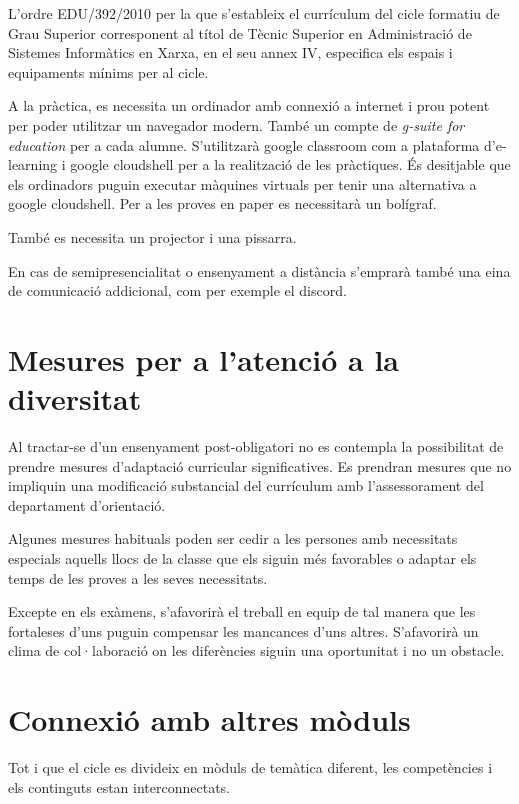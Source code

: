 \documentclass[catalan, a4paper, 12pt, titlepage]{article}
\begin{document}
L'ordre EDU/392/2010 per la que s'estableix el currículum del cicle formatiu de Grau Superior corresponent al títol de Tècnic Superior en Administració de Sistemes Informàtics en Xarxa, en el seu annex IV, especifica els espais i equipaments mínims per al cicle.

A la pràctica, es necessita un ordinador amb connexió a internet i prou potent per poder utilitzar un navegador modern. També un compte de \emph{g-suite for education} per a cada alumne. S'utilitzarà google classroom com a plataforma d'e-learning i google cloudshell per a la realització de les pràctiques. És desitjable que els ordinadors puguin executar màquines virtuals per tenir una alternativa a google cloudshell. Per a les proves en paper es necessitarà un bolígraf.

També es necessita un projector i una pissarra.

En cas de semipresencialitat o ensenyament a distància s'emprarà també una eina de comunicació addicional, com per exemple el discord.

\section{Mesures per a l'atenció a la diversitat}

Al tractar-se d'un ensenyament post-obligatori no es contempla la possibilitat de prendre mesures d'adaptació curricular significatives. Es prendran mesures que no impliquin una modificació substancial del currículum amb l'assessorament del departament d'orientació.

Algunes mesures habituals poden ser cedir a les persones amb necessitats especials aquells llocs de la classe que els siguin més favorables o adaptar els temps de les proves a les seves necessitats.

Excepte en els exàmens, s'afavorirà el treball en equip de tal manera que les fortaleses d'uns puguin compensar les mancances d'uns altres. S'afavorirà un clima de col·laboració on les diferències siguin una oportunitat i no un obstacle.

\section{Connexió amb altres mòduls}

Tot i que el cicle es divideix en mòduls de temàtica diferent, les competències i els continguts estan interconnectats.
\end{document}
